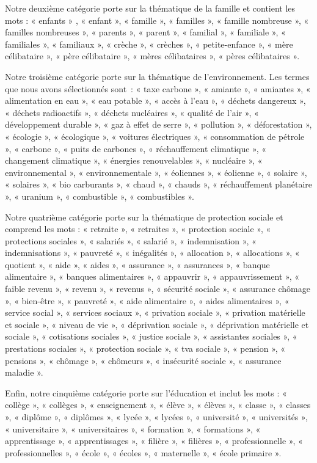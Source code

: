 \documentclass[
  letterpaper,
  DIV=11,
  numbers=noendperiod]{scrartcl}
\begin{document}
Notre deuxième catégorie porte sur la thématique de la famille et
contient les mots : « enfants » , « enfant », « famille », « familles »,
« famille nombreuse », « familles nombreuses », « parents », « parent »,
« familial », « familiale », « familiales », « familiaux », « crèche »,
« crèches », « petite-enfance », « mère célibataire », « père
célibataire », « mères célibataires », « pères célibataires ».

Notre troisième catégorie porte sur la thématique de l'environnement.
Les termes que nous avons sélectionnés sont~: « taxe carbone », «
amiante », « amiantes », « alimentation en eau », « eau potable », «
accès à l'eau », « déchets dangereux », « déchets radioactifs », «
déchets nucléaires », « qualité de l'air », « développement durable », «
gaz à effet de serre », « pollution », « déforestation », « écologie »,
« écologique », « voitures électriques », « consommation de pétrole », «
carbone », « puits de carbones », « réchauffement climatique », «
changement climatique », « énergies renouvelables », « nucléaire », «
environnemental », « environnementale », « éoliennes », « éolienne », «
solaire », « solaires », « bio carburants », « chaud », « chauds », «
réchauffement planétaire », « uranium », « combustible », « combustibles
».

Notre quatrième catégorie porte sur la thématique de protection sociale
et comprend les mots : « retraite », « retraites », « protection sociale
», « protections sociales », « salariés », « salarié », « indemnisation
», « indemnisations », « pauvreté », « inégalités », « allocation », «
allocations », « quotient », « aide », « aides », « assurance », «
assurances », « banque alimentaire », « banques alimentaires », «
appauvrir », « appauvrissement », « faible revenu », « revenu », «
revenus », « sécurité sociale », « assurance chômage », « bien-être », «
pauvreté », « aide alimentaire », « aides alimentaires », « service
social », « services sociaux », « privation sociale », « privation
matérielle et sociale », « niveau de vie », « déprivation sociale », «
déprivation matérielle et sociale », « cotisations sociales », « justice
sociale », « assistantes sociales », « prestations sociales », «
protection sociale », « tva sociale », « pension », « pensions », «
chômage », « chômeurs », « insécurité sociale », « assurance maladie ».

Enfin, notre cinquième catégorie porte sur l'éducation et inclut les
mots : « collège », « collèges », « enseignement », « élève », « élèves
», « classe », « classes », « diplôme », « diplômes », « lycée », «
lycées », « université », « universités », « universitaire », «
universitaires », « formation », « formations », « apprentissage », «
apprentissages », « filière », « filières », « professionnelle », «
professionnelles », « école », « écoles », « maternelle », « école
primaire ».
\end{document}
